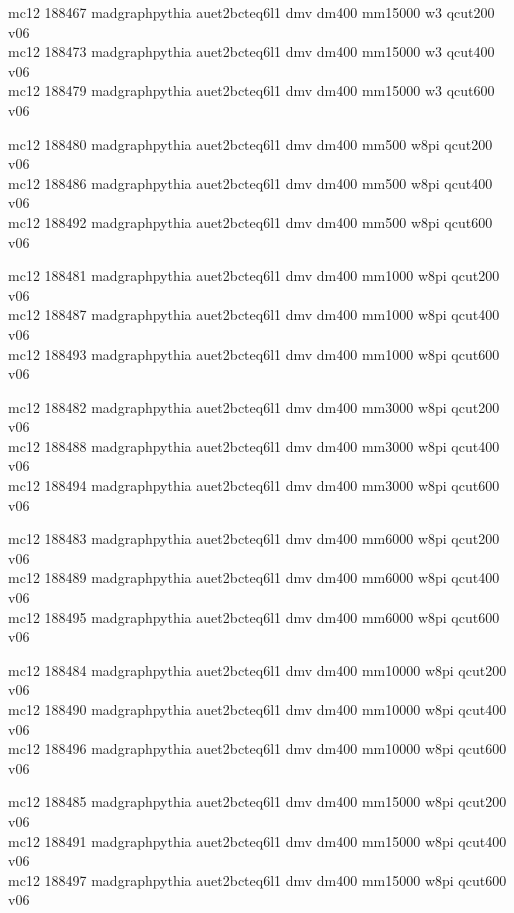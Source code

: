 mc12 188467 madgraphpythia auet2bcteq6l1 dmv dm400 mm15000 w3 qcut200 v06\\
mc12 188473 madgraphpythia auet2bcteq6l1 dmv dm400 mm15000 w3 qcut400 v06\\
mc12 188479 madgraphpythia auet2bcteq6l1 dmv dm400 mm15000 w3 qcut600 v06

mc12 188480 madgraphpythia auet2bcteq6l1 dmv dm400 mm500 w8pi qcut200 v06\\
mc12 188486 madgraphpythia auet2bcteq6l1 dmv dm400 mm500 w8pi qcut400 v06\\
mc12 188492 madgraphpythia auet2bcteq6l1 dmv dm400 mm500 w8pi qcut600 v06

mc12 188481 madgraphpythia auet2bcteq6l1 dmv dm400 mm1000 w8pi qcut200 v06\\
mc12 188487 madgraphpythia auet2bcteq6l1 dmv dm400 mm1000 w8pi qcut400 v06\\
mc12 188493 madgraphpythia auet2bcteq6l1 dmv dm400 mm1000 w8pi qcut600 v06

mc12 188482 madgraphpythia auet2bcteq6l1 dmv dm400 mm3000 w8pi qcut200 v06\\
mc12 188488 madgraphpythia auet2bcteq6l1 dmv dm400 mm3000 w8pi qcut400 v06\\
mc12 188494 madgraphpythia auet2bcteq6l1 dmv dm400 mm3000 w8pi qcut600 v06

mc12 188483 madgraphpythia auet2bcteq6l1 dmv dm400 mm6000 w8pi qcut200 v06\\
mc12 188489 madgraphpythia auet2bcteq6l1 dmv dm400 mm6000 w8pi qcut400 v06\\
mc12 188495 madgraphpythia auet2bcteq6l1 dmv dm400 mm6000 w8pi qcut600 v06

mc12 188484 madgraphpythia auet2bcteq6l1 dmv dm400 mm10000 w8pi qcut200 v06\\
mc12 188490 madgraphpythia auet2bcteq6l1 dmv dm400 mm10000 w8pi qcut400 v06\\
mc12 188496 madgraphpythia auet2bcteq6l1 dmv dm400 mm10000 w8pi qcut600 v06

mc12 188485 madgraphpythia auet2bcteq6l1 dmv dm400 mm15000 w8pi qcut200 v06\\
mc12 188491 madgraphpythia auet2bcteq6l1 dmv dm400 mm15000 w8pi qcut400 v06\\
mc12 188497 madgraphpythia auet2bcteq6l1 dmv dm400 mm15000 w8pi qcut600 v06